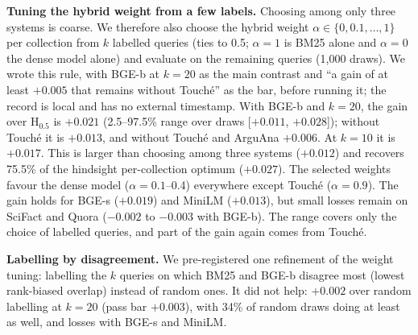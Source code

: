 \documentclass[conference]{IEEEtran}
\newcommand{\Hy}{\textsc{H}}
\begin{document}
\textbf{Tuning the hybrid weight from a few labels.} Choosing among only three systems is coarse. We therefore also choose the hybrid weight $\alpha\in\{0,0.1,\dots,1\}$ per collection from $k$ labelled queries (ties to 0.5; $\alpha=1$ is BM25 alone and $\alpha=0$ the dense model alone) and evaluate on the remaining queries (1,000 draws). We wrote this rule, with BGE-b at $k=20$ as the main contrast and ``a gain of at least $+0.005$ that remains without Touch\'e'' as the bar, before running it; the record is local and has no external timestamp. With BGE-b and $k=20$, the gain over \Hy$_{0.5}$ is $+0.021$ (2.5--97.5\% range over draws [$+0.011$, $+0.028$]); without Touch\'e it is $+0.013$, and without Touch\'e and ArguAna $+0.006$. At $k=10$ it is $+0.017$. This is larger than choosing among three systems ($+0.012$) and recovers 75.5\% of the hindsight per-collection optimum ($+0.027$). The selected weights favour the dense model ($\alpha=0.1$--0.4) everywhere except Touch\'e ($\alpha=0.9$). The gain holds for BGE-s ($+0.019$) and MiniLM ($+0.013$), but small losses remain on SciFact and Quora ($-0.002$ to $-0.003$ with BGE-b). The range covers only the choice of labelled queries, and part of the gain again comes from Touch\'e.

\textbf{Labelling by disagreement.} We pre-registered one refinement of the weight tuning: labelling the $k$ queries on which BM25 and BGE-b disagree most (lowest rank-biased overlap) instead of random ones. It did not help: $+0.002$ over random labelling at $k=20$ (pass bar $+0.003$), with 34\% of random draws doing at least as well, and losses with BGE-s and MiniLM.
\end{document}
